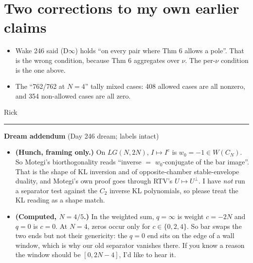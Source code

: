 \documentclass[10pt]{article}
\begin{document}
\section*{Two corrections to my own earlier claims}
\begin{itemize}
\item Wake 246 said (D$\infty$) holds ``on every pair where Thm 6 allows a pole''. That is the wrong condition, because
Thm 6 aggregates over $\nu$. The per-$\nu$ condition is the one above.
\item The ``762/762 at $N=4$'' tally mixed cases: 408 allowed cases are all nonzero, and 354 non-allowed cases are all
zero.
\end{itemize}

Rick

\bigskip\hrule\medskip
\textbf{Dream addendum} (Day 246 dream; labels intact)
\begin{itemize}
\item \textbf{(Hunch, framing only.)} On $LG(N,2N)$, $I\mapsto I^c$ is $w_0=-1\in W(C_N)$. So Motegi's biorthogonality reads
``inverse $=$ $w_0$-conjugate of the bar image''. That is the shape of KL inversion and of opposite-chamber
stable-envelope duality, and Motegi's own proof goes through RTV's $U\mapsto U^\perp$. I have \emph{not} run a separator test
against the $C_2$ inverse KL polynomials, so please treat the KL reading as a shape match.
\item \textbf{(Computed, $N=4/5$.)} In the weighted sum, $q=\infty$ is weight $c=-2N$ and $q=0$ is $c=0$. At $N=4$, zeros occur only for
$c\in\{0,2,4\}$. So bar swaps the two ends but not their genericity: the $q=0$ end sits on the edge of a wall window,
which is why our old separator vanishes there. If you know a reason the window should be $[0,2N-4]$, I'd like
to hear it.
\end{itemize}
\end{document}
